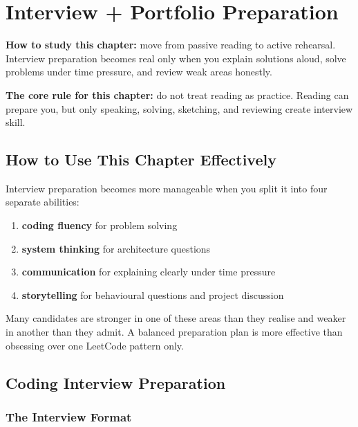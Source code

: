 \documentclass[12pt, a4paper, oneside]{book}
\begin{document}
\chapter{Interview + Portfolio Preparation}

\begin{studybox}
\textbf{How to study this chapter:} move from passive reading to active rehearsal. Interview preparation becomes real only when you explain solutions aloud, solve problems under time pressure, and review weak areas honestly.
\end{studybox}

\begin{notebox}
\textbf{The core rule for this chapter:} do not treat reading as practice. Reading can prepare you, but only speaking, solving, sketching, and reviewing create interview skill.
\end{notebox}

\section{How to Use This Chapter Effectively}

Interview preparation becomes more manageable when you split it into four separate abilities:
\begin{enumerate}[leftmargin=2em]
    \item \textbf{coding fluency} for problem solving
    \item \textbf{system thinking} for architecture questions
    \item \textbf{communication} for explaining clearly under time pressure
    \item \textbf{storytelling} for behavioural questions and project discussion
\end{enumerate}

\begin{intuitionbox}
Many candidates are stronger in one of these areas than they realise and weaker in another than they admit. A balanced preparation plan is more effective than obsessing over one LeetCode pattern only.
\end{intuitionbox}

\section{Coding Interview Preparation}

\subsection{The Interview Format}
\end{document}
